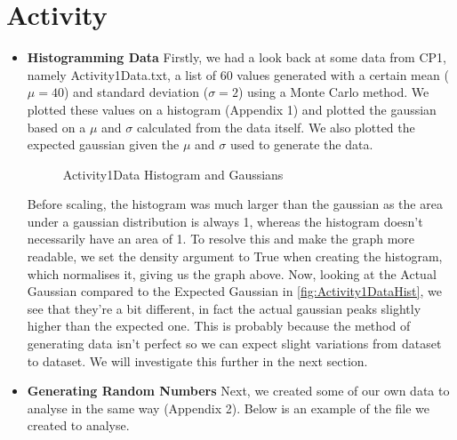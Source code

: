 \documentclass[12pt]{article}
\begin{document}
    \section{Activity}
    \begin{itemize}
        \item \textbf{Histogramming Data}\newline
        Firstly, we had a look back at some data from CP1, namely Activity1Data.txt, a list 
        of 60 values generated with a certain mean ($\mu=40$) and standard deviation ($\sigma=2$) 
        using a Monte Carlo method. We plotted these values on a histogram (Appendix 1) and plotted 
        the gaussian based on a $\mu$ and $\sigma$ calculated from the data itself. We also plotted 
        the expected gaussian given the $\mu$ and $\sigma$ used to generate the data. 
        
        \begin{figure}[H]
            \begin{center}
                \scalebox{.7}{}
                \caption{Activity1Data Histogram and Gaussians}
                \label{fig:Activity1DataHist}
            \end{center}
        \end{figure}
        
        \noindent
        Before scaling, the histogram was much larger than the gaussian as the area under a gaussian 
        distribution is always 1, whereas the histogram doesn't necessarily have an area of 1. To 
        resolve this and make the graph more readable, we set the density argument to True when 
        creating the histogram, which normalises it, giving us the graph above. 
        \newline
        Now, looking at the Actual Gaussian compared to the Expected Gaussian in 
        \autoref{fig:Activity1DataHist}, we see that they're a bit different, in fact the actual 
        gaussian peaks slightly higher than the expected one. This is probably because the method 
        of generating data isn't perfect so we can expect slight variations from dataset to dataset. 
        We will investigate this further in the next section.

        \item \textbf{Generating Random Numbers}\newline
        Next, we created some of our own data to analyse in the same way (Appendix 2). Below is an 
        example of the file we created to analyse.
        \newline
        
        

\end{itemize}
\end{document}
